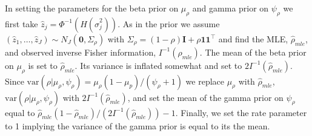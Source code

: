 \documentclass[ba]{imsart}
\newcommand{\mb}{\mathbf}
\begin{document}
In setting the parameters for the beta prior on $\mu_{\rho}$ and gamma prior on  $\psi_\rho$ we first take $\hat z_{j}= \Phi^{-1} (H(\hat\sigma_{j}^{2}))$. As in the prior we assume $(\hat z_1,\dots,\hat z_J)\sim N_J(\mathbf{0}, \Sigma_\rho)$ with
$\Sigma_\rho=(1-\rho)\mb{I}+\rho \mb{1}\mb{1}^{\top}$ and find the MLE, $\hat\rho_{mle}$, and observed inverse Fisher information, $I^{-1}(\rho_{mle})$. The mean of the beta prior on $\mu_{\rho}$ is set to $\hat\rho_{mle}$. Its variance is inflated somewhat and set to $2I^{-1}(\hat\rho_{mle})$. Since $\text{var}(\rho|\mu_{\rho}, \psi_{\rho})=\mu_{\rho} (1-\mu_{p})/(\psi_{\rho}+1)$ we replace $\mu_{\rho}$ with $\hat\rho_{mle}$, $\text{var}(\rho|\mu_{\rho}, \psi_{\rho})$ with $2I^{-1}(\hat\rho_{mle})$, and set the mean of the gamma prior on $\psi_{\rho}$ equal to $\hat\rho_{mle} (1-\hat\rho_{mle})/(2I^{-1}(\hat\rho_{mle}))-1$. Finally, we  set the rate parameter to 1 implying the variance of the gamma prior is equal to its the mean.

%




\end{document}
